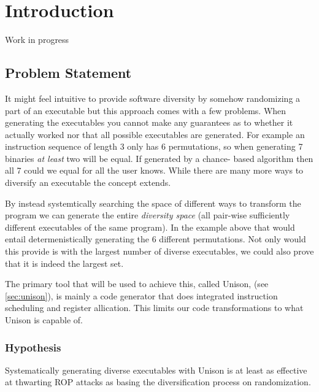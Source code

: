\chapter{Introduction}

Work in progress

\section{Problem Statement}

It might feel intuitive to provide software diversity by somehow randomizing a part of an
executable but this approach comes with a few problems. When generating the executables
you cannot make any guarantees as to whether it actually worked nor that all possible executables
are generated. For example an instruction sequence of length 3 only has 6 permutations, so
when generating 7 binaries \textit{at least} two will be equal. If generated by a chance-
based algorithm then all 7 could we equal for all the user knows. While there are many
more ways to diversify an executable the concept extends.

By instead systemtically searching the space of different ways to transform the program
we can generate the entire \textit{diversity space} (all pair-wise sufficiently different
executables of the same program). In the example above that would entail determenistically
generating the 6 different permutations. Not only would this provide is with the largest
number of diverse executables, we could also prove that it is indeed the largest set.

The primary tool that will be used to achieve this, called Unison, (see \ref{sec:unison}),
is mainly a code generator that does integrated instruction scheduling and register
allication. This limits our code transformations to what Unison is capable of.

\subsection{Hypothesis}

Systematically generating diverse executables with Unison is at least as effective at
thwarting ROP attacks as basing the diversification process on randomization.
